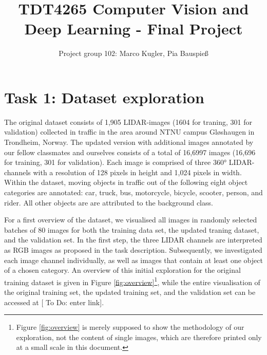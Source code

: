 \documentclass{article}
\title{TDT4265 Computer Vision and Deep Learning - Final Project}
\author{Project group 102: Marco Kugler, Pia Bauspieß}
\newcommand{\todo}[1]{{\sf[{\footnotesize{{\color{blue} To Do: #1}}]}}}
\begin{document}
\maketitle

\section*{Task 1: Dataset exploration}

The original dataset consists of 1,905 LIDAR-images (1604 for traning, 301 for validation) collected in traffic in the area around NTNU campus Gløshaugen in Trondheim, Norway. The updated version with additional images annotated by our fellow classmates and ourselves consists of a total of 16,6997 images (16,696 for training, 301 for validation). Each image is comprised of three 360° LIDAR-channels with a resolution of 128 pixels in height and 1,024 pixels in width. Within the dataset, moving objects in traffic out of the following eight object categories are annotated: car, truck, bus, motorcycle, bicycle, scooter, person, and rider. All other objects are are attributed to the background class.

For a first overview of the dataset, we visualised all images in randomly selected batches of 80 images for both the training data set, the updated traning dataset, and the validation set. In the first step, the three LIDAR channels are interpreted as RGB images as proposed in the task description. Subsequently, we investigated each image channel individually, as well as images that contain at least one object of a chosen category. An overview of this initial exploration for the original training dataset is given in Figure \ref{fig:overview}\footnote{Figure \ref{fig:overview} is merely supposed to show the methodology of our exploration, not the content of single images, which are therefore printed only at a small scale in this document.}, while the entire visualisation of the original training set, the updated training set, and the validation set can be accessed at \todo{enter link}.
\end{document}
